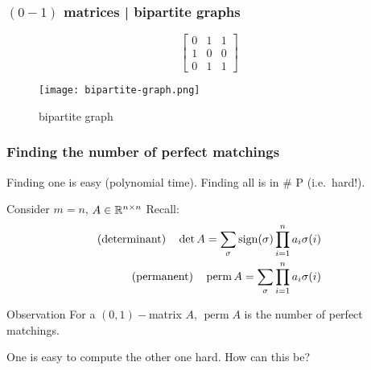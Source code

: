 \documentclass{beamer}
\DeclareMathOperator*{\perm}{perm}
\begin{document}
\begin{frame}
  \frametitle{$(0-1)$ matrices | bipartite graphs}
  \begin{minipage}{0.5\textwidth}
    \begin{equation}
      \begin{bmatrix}
        0 & 1 & 1 \\
        1 & 0 & 0 \\
        0 & 1 & 1
      \end{bmatrix}
    \end{equation}
  \end{minipage}
  \begin{minipage}{0.25\textwidth}
    \begin{figure}[ht]
      \centering
      \texttt{[image: bipartite-graph.png]}
      \caption{bipartite graph}
    \end{figure}
  \end{minipage}

\end{frame}

\begin{frame}
  \frametitle{Finding the number of perfect matchings}
  Finding one is easy (polynomial time).
  Finding all is in \# P (i.e.\ hard!).
  \begin{block}{Consider $m=n$, $A\in \mathbb{R}^{n \times n}$}
    Recall:
    \begin{equation}
      \begin{aligned}
        \text{(determinant)} \quad \det A = \sum_{\sigma} \sign(\sigma) \prod_{i=1}^n a_i \sigma(i) \\
        \text{(permanent)} \quad \perm A = \sum_{\sigma} \prod_{i=1}^n a_i \sigma(i)
      \end{aligned}
    \end{equation}
  \end{block}
  \begin{block}{Observation}
    For a $(0,1)-$matrix $A$, $\perm A$ is the number of perfect matchings.
  \end{block}
  One is easy to compute the other one hard. How can this be?
\end{frame}
\end{document}
